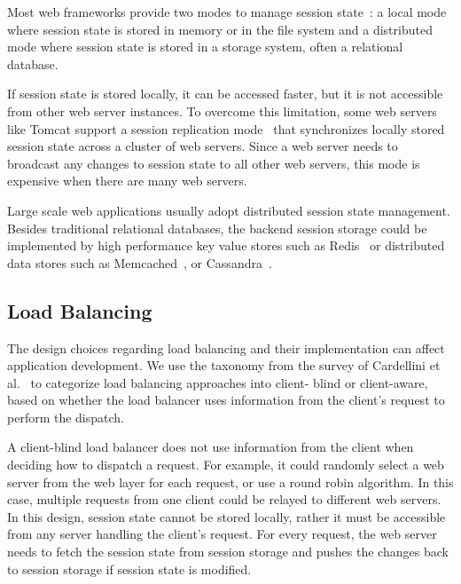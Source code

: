 Most web frameworks provide two modes to manage session
state~\cite{phpdoc,j2eedoc}: a local mode where session state
is stored in memory or in the file system and a distributed mode where
session state is stored in a storage system, often a relational database.

If session state is stored locally, it can be accessed faster, but it is not
accessible from other web server instances.  To overcome this limitation, some
web servers like Tomcat support a session replication
mode~\cite{tomcatcluster} that  synchronizes locally stored session state
across a cluster of web servers.  Since a web server needs to
broadcast any changes to session state to all other web servers, this mode 
is expensive when there are many web servers.

Large scale web applications usually adopt distributed session state management.
Besides traditional relational databases,
the backend session storage could be implemented by high performance key value
stores such as Redis~\cite{redis} or distributed data stores 
such as Memcached~\cite{fitzpatrick2004distributed}, or 
Cassandra~\cite{lakshman2010cassandra}.

\subsection{Load Balancing}

The design choices regarding load balancing and their implementation can 
affect application development.  We use the taxonomy from the survey of Cardellini et
al.~\cite{cardellini2002state} to categorize load balancing approaches into client-
blind or client-aware, based on whether the load balancer uses information from
the client's request to perform the dispatch.

A client-blind load balancer does not use information from the client when
deciding how to dispatch a request. For example, it could randomly select a
web server from the web layer for each request, or use a round robin
algorithm. In this case, multiple requests from one client could be relayed to
different web servers. In this design, session state cannot be stored locally,
rather it must be accessible  from any server handling the client's request.
For every request, the web server needs to fetch the session state from
session storage and pushes the changes back to session storage if session
state is modified.

